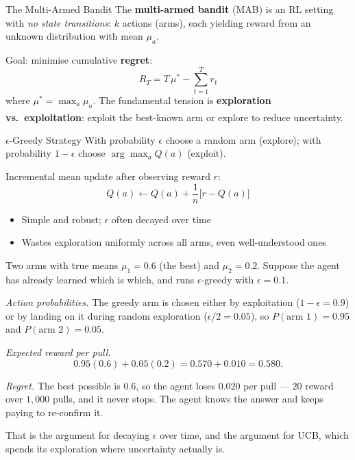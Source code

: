 \begin{v3topic}{The Multi-Armed Bandit}
        The \textbf{multi-armed bandit} (MAB) is an RL setting with
        \emph{no state transitions}: $k$ actions (arms), each yielding reward
        from an unknown distribution with mean $\mu_a$.

        Goal: minimise cumulative \textbf{regret}:
        \begin{equation}
            R_T = T\,\mu^* - \sum_{t=1}^{T} r_t
        \end{equation}
        where $\mu^* = \max_a \mu_a$.
        The fundamental tension is \textbf{exploration vs.\ exploitation}:
        exploit the best-known arm or explore to reduce
        uncertainty.\textsuperscript{\cite[][p.~335]{hurbansGrokkingArtificialIntelligence2020}}

\end{v3topic}
\begin{v3topic}{$\epsilon$-Greedy Strategy}
        With probability $\epsilon$ choose a random arm (explore); with
        probability $1 - \epsilon$ choose $\arg\max_a Q(a)$ (exploit).

        Incremental mean update after observing reward $r$:
        \begin{equation}
            Q(a) \leftarrow Q(a) + \frac{1}{n}\bigl[r - Q(a)\bigr]
        \end{equation}
        \begin{itemize}
            \item Simple and robust; $\epsilon$ often decayed over time
            \item Wastes exploration uniformly across all arms, even
                  well-understood ones
        \end{itemize}
        \textsuperscript{\cite[][p.~336]{hurbansGrokkingArtificialIntelligence2020}}

\begin{workedexample}
Two arms with true means $\mu_1 = 0.6$ (the best) and $\mu_2 = 0.2$. Suppose
the agent has already learned which is which, and runs $\epsilon$-greedy with
$\epsilon = 0.1$.

\emph{Action probabilities.} The greedy arm is chosen either by exploitation
($1-\epsilon = 0.9$) or by landing on it during random exploration
($\epsilon/2 = 0.05$), so $P(\text{arm 1}) = 0.95$ and
$P(\text{arm 2}) = 0.05$.

\emph{Expected reward per pull.}
\[
  0.95(0.6) + 0.05(0.2) = 0.570 + 0.010 = 0.580 .
\]

\emph{Regret.} The best possible is $0.6$, so the agent loses $0.020$ per pull
--- $20$ reward over $1{,}000$ pulls, and it never stops. The agent knows the
answer and keeps paying to re-confirm it.

That is the argument for decaying $\epsilon$ over time, and the argument for
UCB, which spends its exploration where uncertainty actually is.
\end{workedexample}

\end{v3topic}
